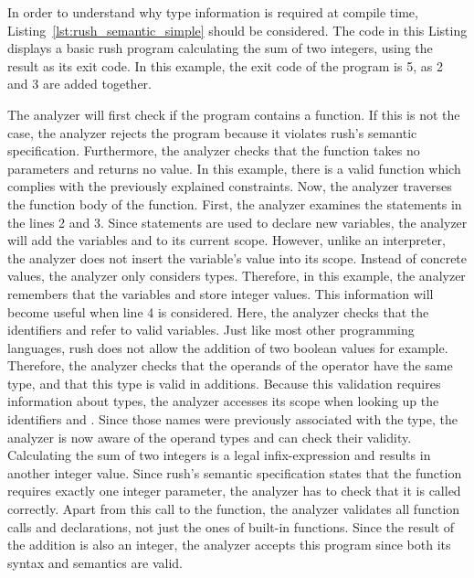 In order to understand why type information is required at compile time,
Listing~\ref{lst:rush_semantic_simple} should be considered.
The code in this Listing displays a basic rush program calculating the sum of two integers, using the result as its exit code.
In this example, the exit code of the program is 5, as 2 and 3 are added together.


The analyzer will first check if the program contains a  function.
If this is not the case, the analyzer rejects the program because it violates rush's semantic specification.
Furthermore, the analyzer checks that the  function takes no parameters and returns no value. In this
example, there is a valid  function which complies with the previously explained constraints. Now, the analyzer traverses the
function body of the  function. First, the analyzer examines the statements in the lines 2 and 3.
Since  statements are used to declare
new variables, the analyzer will add the variables  and  to its
current scope. However, unlike an interpreter, the analyzer does not insert the
variable's value into its scope. Instead of concrete values, the analyzer
only considers types. Therefore, in this example, the
analyzer remembers that the variables  and  store integer values.
This information will become useful when line 4 is considered.
Here, the analyzer checks that the identifiers  and  refer to valid variables.
Just like most other programming languages, rush does not allow the addition
of two boolean values for example. Therefore, the analyzer checks that the operands
of the \qVerb{+} operator have the same type, and that this type is valid in additions.
Because this validation requires information about types, the analyzer accesses
its scope when looking up the identifiers  and . Since those names
were previously associated with the  type, the analyzer is now aware of the
operand types and can check their validity. Calculating the
sum of two integers is a legal infix-expression and results in another integer value. Since rush's
semantic specification states that the  function requires exactly one
integer parameter, the analyzer has to check that it is called correctly.
Apart from this call to the  function, the analyzer validates all function calls and declarations, not
just the ones of built-in functions. Since the result of the addition is also an
integer, the analyzer accepts this program since both its syntax and semantics
are valid.

